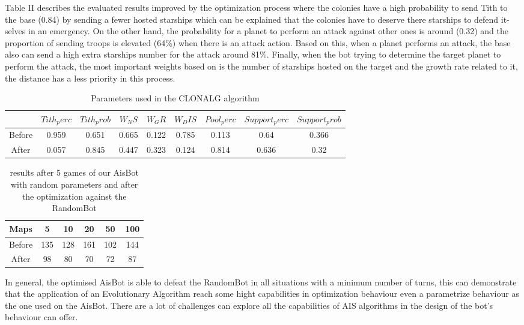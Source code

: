 \documentclass[conference]{IEEEtran}
\begin{document}
Table II describes the evaluated results improved by the optimization process where the colonies have a high probability to send Tith to the base (0.84) by sending a fewer hosted starships which can be explained that the colonies have to deserve there starships to defend it-selves in an emergency. On the other hand, the probability for a planet to perform an attack against other ones is around (0.32) and the proportion of sending troops is elevated (64\%) when there is an attack action. Based on this, when a planet performs an attack, the base also can send a high extra starships number for the attack around 81\%. Finally, when the bot trying to determine the target planet to perform the attack, the most important weights based on is the number of starships hosted on the target and the growth rate related to it, the distance has a less priority in this process. \\

\begin{table}[h!]
\centering
\begin{tabular}{|c|c|c|c|c|c|c|c|c|}
\hline
 & $Tith_perc$ & $Tith_prob$ & $W_NS$ & $W_GR$ & $W_DIS$ & $Pool_perc$ & $Support_perc$ & $Support_prob$ \\ 
 \hline
 Before & 0.959 & 0.651 & 0.665 & 0.122 & 0.785 & 0.113 & 0.64 & 0.366 \\  
 \hline
 After & 0.057 & 0.845 & 0.447 & 0.323 & 0.124 & 0.814 & 0.636 & 0.32 \\
 \hline  
\end{tabular}
\caption{Parameters used in the CLONALG algorithm}
\label{TABLE 2}
\end{table}

\begin{table}[h!]
\centering
\begin{tabular}{|c|c|c|c|c|c|}
\hline
 Maps & 5 & 10 & 20 & 50 & 100 \\ 
 \hline
 Before & 135 & 128 & 161 & 102 & 144 \\  
 \hline
 After & 98 & 80 & 70 & 72 & 87 \\
 \hline  
\end{tabular}
\caption{results after 5 games of our AisBot with random parameters and after the optimization against the RandomBot}
\label{TABLE 3}
\end{table}

In general, the optimised AisBot is able to defeat the RandomBot in all situations with a minimum number of turns, this can demonstrate that the application of an Evolutionary Algorithm reach some hight capabilities in optimization behaviour even a parametrize behaviour as the one used on the AisBot. There are a lot of challenges can explore all the capabilities of AIS algorithms in the design of the bot's behaviour can offer.
\end{document}
